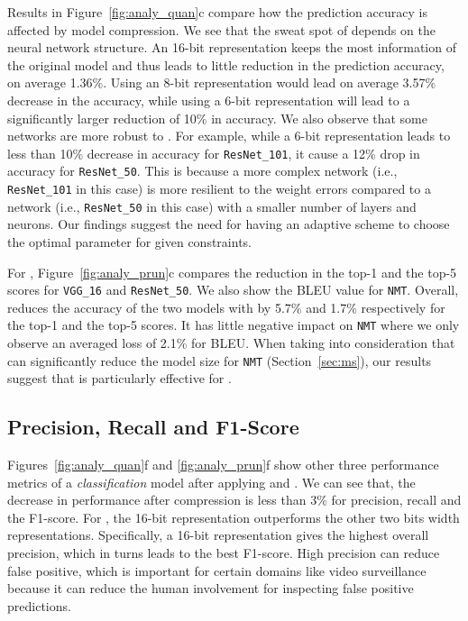 Results in Figure~\ref{fig:analy_quan}c compare how the prediction accuracy is affected by model compression. We see that the sweat spot of
\quantization depends on the neural network structure. An 16-bit representation keeps the most information of the original model and thus
leads to little reduction in the prediction accuracy, on average  1.36\%.  Using an 8-bit representation would lead on average 3.57\%
decrease in the accuracy, while using a 6-bit representation will lead to a significantly larger reduction of 10\% in  accuracy. We also
observe that some networks are more robust to \quantization. For example, while a 6-bit representation leads to less than 10\% decrease in
accuracy for \texttt{ResNet\_101}, it cause a 12\% drop in accuracy for \texttt{ResNet\_50}. This is because a more complex network (i.e.,
\texttt{ResNet\_101} in this case) is more resilient to the weight errors compared to a network (i.e., \texttt{ResNet\_50} in this case)
with a smaller number of layers and neurons. Our findings suggest the need for having an adaptive scheme to choose the optimal
\dquantization parameter for given constraints.


For \pruning, Figure~\ref{fig:analy_prun}c compares the reduction in the top-1 and the top-5 scores for \texttt{VGG\_16} and
\texttt{ResNet\_50}. We also show the BLEU value for \texttt{NMT}. Overall, \pruning reduces the accuracy of the two \CNN models with by
5.7\% and 1.7\% respectively for the top-1 and the top-5 scores. It has little negative impact on \texttt{NMT} where we only observe an
averaged loss of 2.1\% for BLEU. When taking into consideration that \pruning can significantly reduce the model size for \texttt{NMT}
(Section~\ref{sec:ms}), our results suggest that \pruning is particularly effective for \RNNs.

\subsection{Precision, Recall and F1-Score}

Figures~\ref{fig:analy_quan}f and \ref{fig:analy_prun}f show other three performance metrics of a \emph{classification} model after
applying \quantization and \pruning. We can see that, the decrease in performance after compression is  less than 3\% for precision, recall
and the F1-score. For \quantization, the 16-bit representation outperforms the other two bits width representations. Specifically,  a
16-bit representation gives the highest overall precision, which in turns leads to the best F1-score. High precision can reduce false
positive, which is important for certain domains like video surveillance because it can reduce the human involvement for inspecting false
positive predictions.

